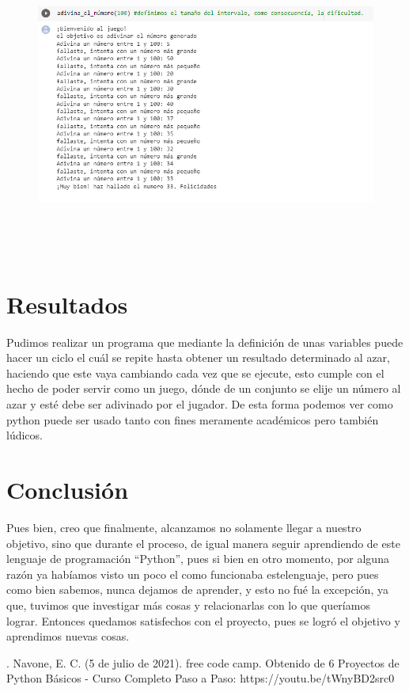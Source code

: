 \documentclass[a4paper,12pt]{article}
\begin{document}
    \begin{figure}[H]
    \caption{}
    \centering \includegraphics[width=16cm, height=10cm]{ejem.png}
    \label{fig1:my_label}
    \end{figure}  

\section{Resultados}
\large{Pudimos realizar un programa que mediante la definición de unas variables puede hacer un ciclo el cuál se repite hasta obtener un resultado determinado al azar, haciendo que este vaya cambiando cada vez que se ejecute, esto cumple con el hecho de poder servir como un juego, dónde de un conjunto se elije un número al azar y esté debe ser adivinado por el jugador. De esta forma podemos ver como python puede ser usado tanto con fines meramente académicos pero también lúdicos.}

\section{Conclusión}
\large{Pues bien, creo que finalmente, alcanzamos no solamente llegar a nuestro objetivo, sino que durante el proceso, de igual manera seguir aprendiendo de este lenguaje de programación ``Python'', pues si bien en otro momento, por alguna razón ya habíamos visto un poco el como funcionaba estelenguaje, pero pues como bien sabemos, nunca dejamos de aprender, y esto no fué la excepción, ya que, tuvimos que investigar más cosas y relacionarlas con lo que queríamos lograr. Entonces quedamos satisfechos con el proyecto, pues se logró el objetivo y aprendimos nuevas cosas.}


\begin{thebibliography}{}
\bibitem{}. Navone, E. C. (5 de julio de 2021). free code camp. Obtenido de 6 Proyectos de Python Básicos - Curso Completo Paso a Paso: https://youtu.be/tWnyBD2src0

\end{thebibliography}
\end{document}
